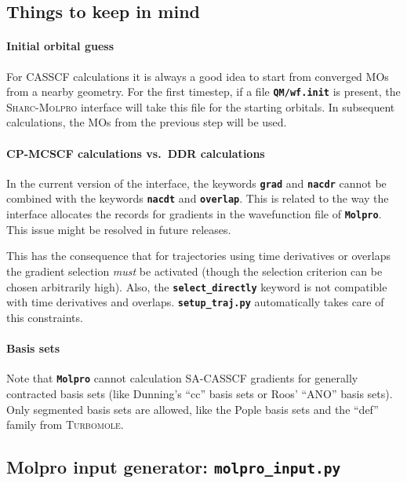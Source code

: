 \documentclass[a4paper,11pt,DIV=15,openany,twoside=false]{scrbook}
\newcommand{\sharc}{\textsc{Sharc}}
\newcommand{\ttt}[1]{\textbf{\texttt{#1}}}
\begin{document}
\subsection{Things to keep in mind}

\paragraph{Initial orbital guess}

For CASSCF calculations it is always a good idea to start from converged MOs from a nearby geometry. For the first timestep, if a file \ttt{QM/wf.init} is present, the \sharc-\textsc{Molpro} interface will take this file for the starting orbitals. In subsequent calculations, the MOs from the previous step will be used.

\paragraph{CP-MCSCF calculations vs.\ DDR calculations}

In the current version of the interface, the keywords \ttt{grad} and \ttt{nacdr} cannot be combined with the keywords \ttt{nacdt} and \ttt{overlap}. This is related to the way the interface allocates the records for gradients in the wavefunction file of \ttt{Molpro}. This issue might be resolved in future releases.

This has the consequence that for trajectories using time derivatives or overlaps the gradient selection \textit{must} be activated (though the selection criterion can be chosen arbitrarily high). Also, the \ttt{select\_directly} keyword is not compatible with time derivatives and overlaps. \ttt{setup\_traj.py} automatically takes care of this constraints.

\paragraph{Basis sets}

Note that \ttt{Molpro} cannot calculation SA-CASSCF gradients for generally contracted basis sets (like Dunning's ``cc'' basis sets or Roos' ``ANO'' basis sets). Only segmented basis sets are allowed, like the Pople basis sets and the ``def'' family from \textsc{Turbomole}.

\subsection{Molpro input generator: \ttt{molpro\_input.py}}\label{sec:molpro_input.py}
\end{document}
